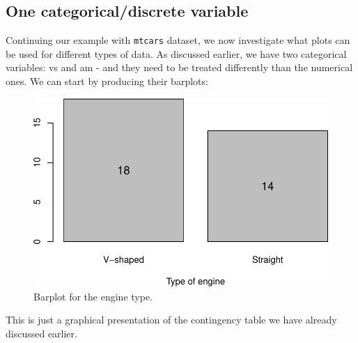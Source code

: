 \documentclass[
]{book}
\newenvironment{Shaded}{\begin{snugshade}}{\end{snugshade}}
\newcommand{\AttributeTok}[1]{\textcolor[rgb]{0.13,0.29,0.53}{#1}}
\newcommand{\DecValTok}[1]{\textcolor[rgb]{0.00,0.00,0.81}{#1}}
\newcommand{\FloatTok}[1]{\textcolor[rgb]{0.00,0.00,0.81}{#1}}
\newcommand{\FunctionTok}[1]{\textcolor[rgb]{0.13,0.29,0.53}{\textbf{#1}}}
\newcommand{\NormalTok}[1]{#1}
\newcommand{\OtherTok}[1]{\textcolor[rgb]{0.56,0.35,0.01}{#1}}
\newcommand{\SpecialCharTok}[1]{\textcolor[rgb]{0.81,0.36,0.00}{\textbf{#1}}}
\newcommand{\StringTok}[1]{\textcolor[rgb]{0.31,0.60,0.02}{#1}}
\theoremstyle{definition}
\theoremstyle{definition}
\theoremstyle{definition}
\theoremstyle{definition}
\theoremstyle{remark}
\begin{document}
\subsection{One categorical/discrete variable}\label{one-categoricaldiscrete-variable}

Continuing our example with \texttt{mtcars} dataset, we now investigate what plots can be used for different types of data. As discussed earlier, we have two categorical variables: vs and am - and they need to be treated differently than the numerical ones. We can start by producing their barplots:

\begin{Shaded}
\end{Shaded}

\begin{figure}
\centering
\includegraphics{Svetunkov---Statistics-for-Business-Analytics_files/figure-latex/barplotVS-1.pdf}
\caption{\label{fig:barplotVS}Barplot for the engine type.}
\end{figure}

This is just a graphical presentation of the contingency table we have already discussed earlier.
\end{document}
